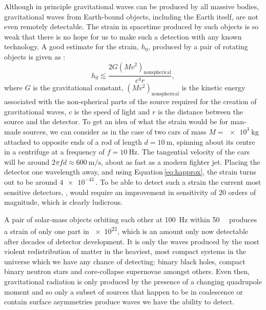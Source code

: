Although in principle gravitational waves can be produced by all massive bodies, gravitational waves from Earth-bound objects, including the Earth itself, are not even remotely detectable. The strain in spacetime produced by such objects is so weak that there is no hope for us to make such a detection with any known technology. A good estimate for the strain, $h_0$, produced by a pair of rotating objects is given as \cite{Sathyaprakash2009}:
\begin{equation}
  \label{eq:happrox}
  h_0 \lesssim \frac{2 G \left( M v^{2} \right)_{\text{nonspherical}}}{c^4 r},
\end{equation}
where $G$ is the gravitational constant, $\left( M v^{2} \right)_{\text{nonspherical}}$ is the kinetic energy associated with the non-spherical parts of the source required for the creation of gravitational waves, $c$ is the speed of light and $r$ is the distance between the source and the detector. To get an idea of what the strain would be for man-made sources, we can consider as in \cite{Sathyaprakash2009} the case of two cars of mass $M = \SI{e3}{\kilo\gram}$ attached to opposite ends of a rod of length $d = \SI{10}{\meter}$, spinning about its centre in a centrifuge at a frequency of $f = \SI{10}{\hertz}$. The tangential velocity of the cars will be around $2 \pi f d \approx \SI{600}{\meter\per\second}$, about as fast as a modern fighter jet. Placing the detector one wavelength away, and using Equation\,\ref{eq:happrox}, the strain turns out to be around $\SI{4e-43}{}$. To be able to detect such a strain the current most sensitive detectors, \ALIGO{}, would require an improvement in sensitivity of \SI{20}{} orders of magnitude, which is clearly ludicrous.

A pair of solar-mass objects orbiting each other at \SI{100}{\hertz} within \SI{50}{\mega\lightyear} produces a strain of only one part in \SI{e21}{}, which is an amount only now detectable after decades of detector development. It is only the waves produced by the most violent redistribution of matter in the heaviest, most compact systems in the universe which we have any chance of detecting: binary black holes, compact binary neutron stars and core-collapse supernovae amongst others. Even then, gravitational radiation is only produced by the presence of a changing quadrupole moment and so only a subset of sources that happen to be in coalescence or contain surface asymmetries produce waves we have the ability to detect.

